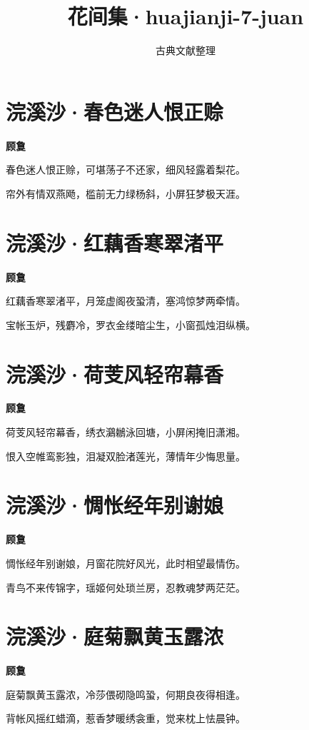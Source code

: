 \documentclass[12pt,a4paper]{ctexbook}
\title{花间集·huajianji-7-juan}
\author{古典文献整理}
\date{}
\begin{document}
\maketitle
\tableofcontents
\newpage
\section{浣溪沙·春色迷人恨正赊}
\textbf{顾敻}\par\vspace{0.5em}
春色迷人恨正赊，可堪荡子不还家，细风轻露着梨花。\par
帘外有情双燕飏，槛前无力绿杨斜，小屏狂梦极天涯。\par

\section{浣溪沙·红藕香寒翠渚平}
\textbf{顾敻}\par\vspace{0.5em}
红藕香寒翠渚平，月笼虚阁夜蛩清，塞鸿惊梦两牵情。\par
宝帐玉炉，残麝冷，罗衣金缕暗尘生，小窗孤烛泪纵横。\par

\section{浣溪沙·荷芰风轻帘幕香}
\textbf{顾敻}\par\vspace{0.5em}
荷芰风轻帘幕香，绣衣鸂鶒泳回塘，小屏闲掩旧潇湘。\par
恨入空帷鸾影独，泪凝双脸渚莲光，薄情年少悔思量。\par

\section{浣溪沙·惆怅经年别谢娘}
\textbf{顾敻}\par\vspace{0.5em}
惆怅经年别谢娘，月窗花院好风光，此时相望最情伤。\par
青鸟不来传锦字，瑶姬何处琐兰房，忍教魂梦两茫茫。\par

\section{浣溪沙·庭菊飘黄玉露浓}
\textbf{顾敻}\par\vspace{0.5em}
庭菊飘黄玉露浓，冷莎偎砌隐鸣蛩，何期良夜得相逢。\par
背帐风摇红蜡滴，惹香梦暖绣衾重，觉来枕上怯晨钟。\par
\end{document}
